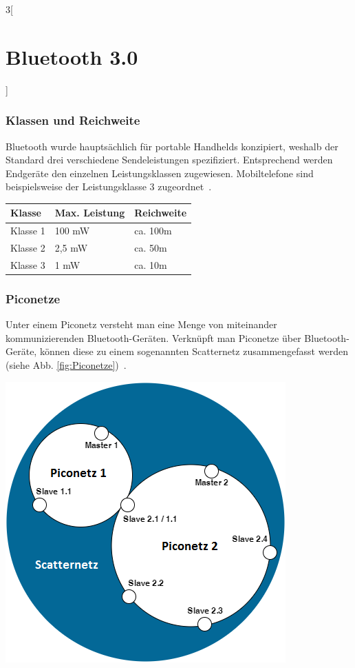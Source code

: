 \begin{multicols}{3}[\section{Bluetooth 3.0}]
\subsubsection*{Klassen und Reichweite}
Bluetooth wurde hauptsächlich für portable Handhelds konzipiert, weshalb der Standard drei verschiedene Sendeleistungen spezifiziert. Entsprechend werden Endgeräte den einzelnen Leistungsklassen zugewiesen. Mobiltelefone sind beispielsweise der Leistungsklasse 3 zugeordnet~\cite{bluetooth3.0.5}. \\

\noindent
\begin{boxedminipage}{\linewidth}
\begin{tabular}{p{} | p{} | p{}}
      \textbf{Klasse} & \textbf{Max. Leistung} & \textbf{Reichweite} \\
      \hline
      Klasse 1 & 100 mW & ca. 100m \\
      \hline
      Klasse 2 & 2,5 mW & ca. 50m \\
      \hline
      Klasse 3 & 1 mW & ca. 10m \\
\end{tabular}
\end{boxedminipage}

\subsubsection*{Piconetze}
Unter einem Piconetz versteht man eine Menge von miteinander kommunizierenden Bluetooth-Geräten. Verknüpft man Piconetze über Bluetooth-Geräte, können diese zu einem sogenannten Scatternetz zusammengefasst werden (siehe Abb. \ref{fig:Piconetze})~\cite{bluetooth3.0.3}.


\begin{Figure}
\begin{center}
\includegraphics[scale=0.4]{Kapitel/Bluetooth3.0/Grafiken/piconetze.png}
\end{center}


\end{Figure}
\end{multicols}
